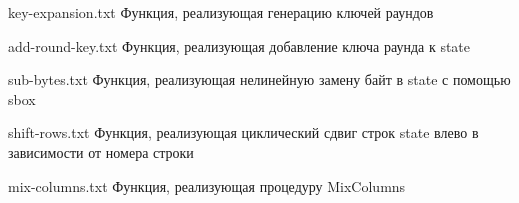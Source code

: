 \clearpage

{key-expansion.txt} %
{Функция, реализующая генерацию ключей раундов} %

{add-round-key.txt} %
{Функция, реализующая добавление ключа раунда к state} %

\clearpage

{sub-bytes.txt} %
{Функция, реализующая нелинейную замену байт в state с помощью sbox} %

{shift-rows.txt} %
{Функция, реализующая циклический сдвиг строк state влево в зависимости от номера строки} %

{mix-columns.txt} %
{Функция, реализующая процедуру MixColumns} %

